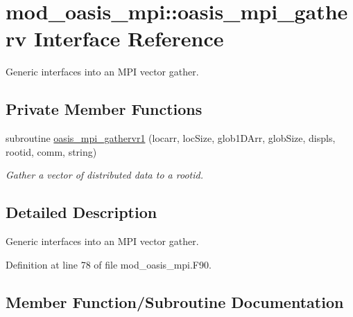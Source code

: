 \hypertarget{interfacemod__oasis__mpi_1_1oasis__mpi__gatherv}{}\section{mod\+\_\+oasis\+\_\+mpi\+:\+:oasis\+\_\+mpi\+\_\+gatherv Interface Reference}
\label{interfacemod__oasis__mpi_1_1oasis__mpi__gatherv}


Generic interfaces into an M\+PI vector gather.  


\subsection*{Private Member Functions}
\begin{DoxyCompactItemize}
\item 
subroutine \hyperlink{interfacemod__oasis__mpi_1_1oasis__mpi__gatherv_a8d17b5a337d8ebec5160dfb891c6a715}{oasis\+\_\+mpi\+\_\+gathervr1} (locarr, loc\+Size, glob1\+D\+Arr, glob\+Size, displs, rootid, comm, string)
\begin{DoxyCompactList}\small\item\em Gather a vector of distributed data to a rootid. \end{DoxyCompactList}\end{DoxyCompactItemize}


\subsection{Detailed Description}
Generic interfaces into an M\+PI vector gather. 

Definition at line 78 of file mod\+\_\+oasis\+\_\+mpi.\+F90.



\subsection{Member Function/\+Subroutine Documentation}
\mbox{\label{interfacemod__oasis__mpi_1_1oasis__mpi__gatherv_a8d17b5a337d8ebec5160dfb891c6a715}} 
